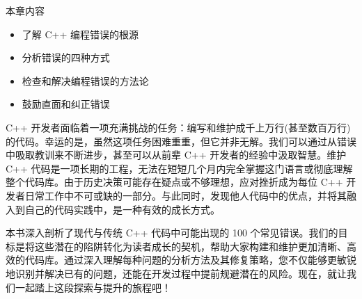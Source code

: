
本章内容

\begin{itemize}
\item
了解 C++ 编程错误的根源

\item
分析错误的四种方式

\item
检查和解决编程错误的方法论

\item
鼓励直面和纠正错误
\end{itemize}

C++ 开发者面临着一项充满挑战的任务：编写和维护成千上万行(甚至数百万行)的代码。幸运的是，虽然这项任务困难重重，但它并非无解。我们可以通过从错误中吸取教训来不断进步，甚至可以从前辈 C++ 开发者的经验中汲取智慧。维护 C++ 代码是一项长期的工程，无法在短短几个月内完全掌握这门语言或彻底理解整个代码库。由于历史决策可能存在疑点或不够理想，应对挫折成为每位 C++ 开发者日常工作中不可或缺的一部分。与此同时，发现他人代码中的优点，并将其融入到自己的代码实践中，是一种有效的成长方式。

本书深入剖析了现代与传统 C++ 代码中可能出现的 100 个常见错误。我们的目标是将这些潜在的陷阱转化为读者成长的契机，帮助大家构建和维护更加清晰、高效的代码库。通过深入理解每种问题的分析方法及其修复策略，您不仅能够更敏锐地识别并解决已有的问题，还能在开发过程中提前规避潜在的风险。现在，就让我们一起踏上这段探索与提升的旅程吧！
